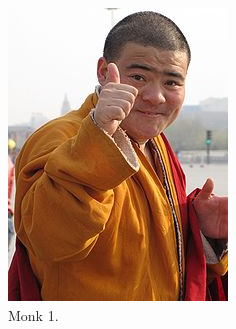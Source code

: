 \begin{figure}[H]
  \centering
  \begin{minipage}[b]{0.45\textwidth}
    \includegraphics[width=\textwidth]{Figures/yeh_monk.jpg}
    \caption[Monk1]{Monk 1.}
  \end{minipage}
  \hfill
  \begin{minipage}[b]{0.45\textwidth}

\end{minipage}
\end{figure}
